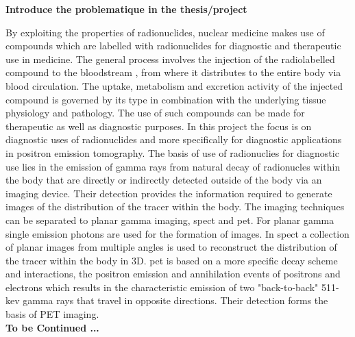 \textbf{Introduce the problematique in the thesis/project}

By exploiting the properties of radionuclides, nuclear medicine makes use of compounds which are labelled with radionuclides for diagnostic and therapeutic use in medicine. The general process involves the injection of the radiolabelled compound to the bloodstream , from where it distributes to the entire body via blood circulation. The uptake, metabolism and excretion activity of the injected compound is governed by its type in combination with the underlying tissue physiology and pathology. 
The use of such compounds can be made for therapeutic as well as diagnostic purposes. In this project the focus is on diagnostic uses of radionuclides and more specifically for diagnostic applications in positron emission tomography. 
The basis of use of radionuclies for diagnostic use lies in the emission of gamma rays from natural decay of radionucles within the body that are directly or indirectly detected outside of the body via an imaging device. Their detection provides the information required to generate images of the distribution of the tracer within the body. The imaging techniques can be separated to planar gamma imaging, \gls{spect} and \gls{pet}. For planar gamma single emission photons are used for the formation of images. In \gls{spect} a collection of planar images from multiple angles is used to reconstruct the distribution of the tracer within the body in 3D. 
\Gls{pet} is based on a more specific decay scheme and interactions, the positron emission and annihilation events of positrons and electrons which results in the characteristic emission of two "back-to-back" 511-kev gamma rays that travel in opposite directions. Their detection forms the basis of PET imaging. 
\\
\textbf{To be Continued ...}

